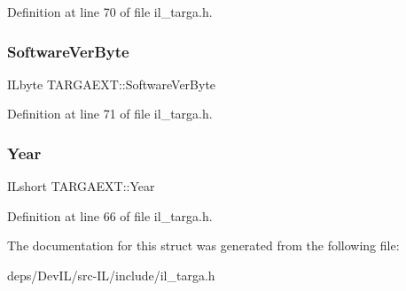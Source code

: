 Definition at line 70 of file il\+\_\+targa.\+h.

\mbox{\label{structTARGAEXT_a694ecaa7bf9c9cbd3246bf58d0d6240e}} 
\subsubsection{\texorpdfstring{Software\+Ver\+Byte}{SoftwareVerByte}}
{\footnotesize\ttfamily I\+Lbyte T\+A\+R\+G\+A\+E\+X\+T\+::\+Software\+Ver\+Byte}



Definition at line 71 of file il\+\_\+targa.\+h.

\mbox{\label{structTARGAEXT_a6a78482d7104954ca5c767f8eca7899e}} 
\subsubsection{\texorpdfstring{Year}{Year}}
{\footnotesize\ttfamily I\+Lshort T\+A\+R\+G\+A\+E\+X\+T\+::\+Year}



Definition at line 66 of file il\+\_\+targa.\+h.



The documentation for this struct was generated from the following file\+:\begin{DoxyCompactItemize}
\item 
deps/\+Dev\+I\+L/src-\/\+I\+L/include/il\+\_\+targa.\+h\end{DoxyCompactItemize}
